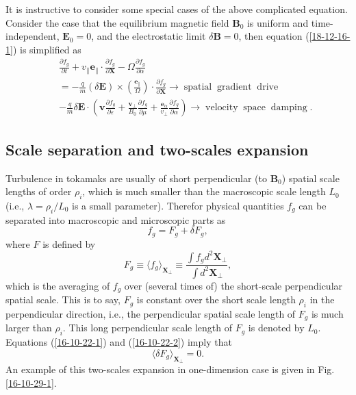 \documentclass{article}
\newcommand{\tmmathbf}[1]{\ensuremath{\boldsymbol{#1}}}
\newcommand{\tmop}[1]{\ensuremath{\operatorname{#1}}}
\begin{document}
It is instructive to consider some special cases of the above complicated
equation. Consider the case that the equilibrium magnetic field $\mathbf{B}_0$
is uniform and time-independent, $\mathbf{E}_0 = 0$, and the electrostatic
limit $\delta \mathbf{B}= 0$, then equation (\ref{18-12-16-1}) is simplified
as
\begin{eqnarray}
  &  & \frac{\partial f_g}{\partial t} + v_{\parallel} \mathbf{e}_{\parallel}
  \cdot \frac{\partial f_g}{\partial \mathbf{X}} - \Omega \frac{\partial
  f_g}{\partial \alpha} \nonumber\\
  &  & = - \frac{q}{m} (\delta \mathbf{E}) \times \left(
  \frac{\tmmathbf{e}_{\parallel}}{\Omega}  \right) \cdot \frac{\partial
  f_g}{\partial \mathbf{X}} \longrightarrow \tmop{spatial} \tmop{gradient}
  \tmop{drive} \\
  &  & - \frac{q}{m} \delta \mathbf{E} \cdot \left( \mathbf{v} \frac{\partial
  f_g}{\partial \varepsilon} + \frac{\mathbf{v}_{\perp}}{B_0}  \frac{\partial
  f_g}{\partial \mu} + \frac{\tmmathbf{e}_{\alpha}}{v_{\perp}}  \frac{\partial
  f_g}{\partial \alpha} \right) \longrightarrow \tmop{velocity} \tmop{space}
  \tmop{damping} . 
\end{eqnarray}

\subsection{Scale separation and two-scales expansion}

Turbulence in tokamaks are usually of short perpendicular (to $\mathbf{B}_0$)
spatial scale lengths of order $\rho_i$, which is much smaller than the
macroscopic scale length $L_0$ (i.e., $\lambda = \rho_i / L_0$ is a small
parameter). Therefor physical quantities $f_g$ can be separated into
macroscopic and microscopic parts as
\begin{equation}
  \label{16-10-22-1} f_g = F_g + \delta F_g,
\end{equation}
where $F$ is defined by
\begin{equation}
  \label{16-10-22-2} F_g \equiv \langle f_g \rangle_{\mathbf{X}_{\perp}}
  \equiv \frac{\int f_g d^2 \mathbf{X}_{\perp}}{\int d^2 \mathbf{X}_{\perp}},
\end{equation}
which is the averaging of $f_g$ over (several times of) the short-scale
perpendicular spatial scale. This is to say, $F_g$ is constant over the short
scale length $\rho_i$ in the perpendicular direction, i.e., the perpendicular
spatial scale length of $F_g$ is much larger than $\rho_i$. This long
perpendicular scale length of $F_g$ is denoted by $L_0$. Equations
(\ref{16-10-22-1}) and (\ref{16-10-22-2}) imply that
\begin{equation}
  \langle \delta F_g \rangle_{\mathbf{X}_{\perp}} = 0.
\end{equation}
An example of this two-scales expansion in one-dimension case is given in Fig.
\ref{16-10-29-1}.
\end{document}
